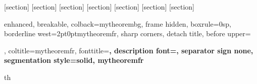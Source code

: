 

\usepackage{amsmath,amsfonts,amsthm,amssymb,mathtools}

\usepackage{enumitem}
\usepackage[most,many,breakable]{tcolorbox}
\usepackage{xcolor}
\usepackage{pgfplots}
\pgfplotsset{compat=1.17}
\usetikzlibrary{matrix}
\usetikzlibrary{calc}
\usetikzlibrary{positioning}
\usetikzlibrary{arrows.meta}
\usetikzlibrary{shapes.geometric}


\usepackage{tabularx}

\renewcommand{\subsubsection}[1]{%
  \vspace{0.5em}
  \textbf{\large #1}\mbox{}\\
  \vspace{0.5em}}

  
\newcommand{\RR}{\mathbb{R}}





[section]
[section]
[section]
[section]
[section]
[section]
[section]

{enhanced, breakable, colback=mytheorembg, frame hidden, boxrule=0sp, 
 borderline west={2pt}{0pt}{mytheoremfr}, sharp corners, detach title, 
 before upper={\renewcommand{\familydefault}{\sfdefault}\selectfont\tcbtitle\par\smallskip}, 
 coltitle=mytheoremfr, fonttitle=\bfseries\sffamily, description font=\mdseries, 
 separator sign none, segmentation style={solid, mytheoremfr}}{th}

